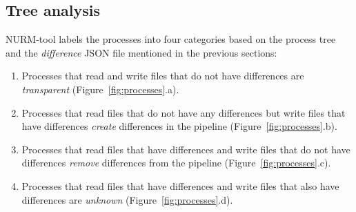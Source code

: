 \documentclass[a4paper,num-refs]{oup-contemporary}
\begin{document}
 


\subsection{Tree analysis}

NURM-tool labels the processes into four 
categories based on the process tree and the \textit{difference} JSON file 
mentioned in the previous sections:
\begin{enumerate}
\item Processes that read and write files that do not have differences 
are \emph{transparent} (Figure~\ref{fig:processes}.a).
\item Processes that read files 
that do not have any differences but write files that have differences 
\emph{create} differences in the pipeline (Figure~\ref{fig:processes}.b).
\item Processes that read files 
that have differences and write files that do not have differences \emph{remove} 
differences from the pipeline (Figure~\ref{fig:processes}.c).
\item Processes that read files that have differences and write files that 
also have differences are 
\emph{unknown} (Figure~\ref{fig:processes}.d).
\end{enumerate}
\end{document}

